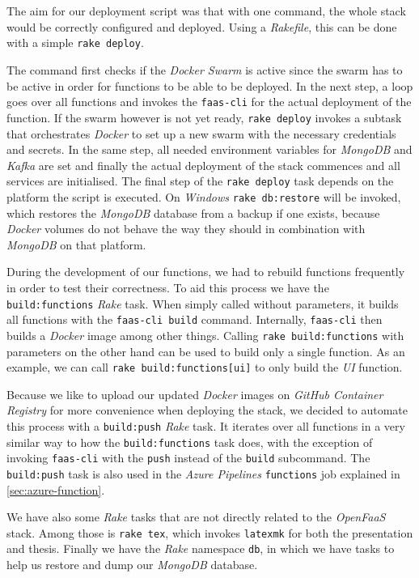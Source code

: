 \section{}

The aim for our deployment script was that with one command, the whole stack would be correctly
configured and deployed. Using a \textit{Rakefile}, this can be done with a simple
\lstinline{rake deploy}.

The command first checks if the \textit{Docker Swarm} is active since the swarm has to be active in
order for functions to be able to be deployed. In the next step, a loop goes over all functions and
invokes the \texttt{faas-cli} for the actual deployment of the function. If the swarm however is not
yet ready, \lstinline{rake deploy} invokes a subtask that orchestrates \textit{Docker} to set up a
new swarm with the necessary credentials and secrets. In the same step, all needed environment variables
for \textit{MongoDB} and \textit{Kafka} are set and finally the actual deployment of the stack
commences and all services are initialised. The final step of the \lstinline{rake deploy} task
depends on the platform the script is executed. On \textit{Windows} \lstinline{rake db:restore} will
be invoked, which restores the \textit{MongoDB} database from a backup if one exists, because
\textit{Docker} volumes do not behave the way they should in combination with \textit{MongoDB} on
that platform.

During the development of our functions, we had to rebuild functions frequently in order to test
their correctness. To aid this process we have the \texttt{build:functions} \textit{Rake}
task. When simply called without parameters, it builds all functions with the \texttt{faas-cli
build} command. Internally, \texttt{faas-cli} then builds a \textit{Docker} image among other
things. Calling \lstinline{rake build:functions} with parameters on the other hand can be used to
build only a single function. As an example, we can call \lstinline{rake build:functions[ui]} to only
build the \textit{UI} function.

Because we like to upload our updated \textit{Docker} images on \textit{GitHub Container Registry}
for more convenience when deploying the stack, we decided to automate this process with a
\texttt{build:push} \textit{Rake} task. It iterates over all functions in a very similar way
to how the \texttt{build:functions} task does, with the exception of invoking
\texttt{faas-cli} with the \texttt{push} instead of the \texttt{build} subcommand. The
\texttt{build:push} task is also used in the \textit{Azure Pipelines} \texttt{functions} job
explained in \autoref{sec:azure-function}.

We have also some \textit{Rake} tasks that are not directly related to the \textit{OpenFaaS} stack.
Among those is \lstinline{rake tex}, which invokes \texttt{latexmk} for both the
presentation and thesis. Finally we have the \textit{Rake} namespace \texttt{db}, in which we
have tasks to help us restore and dump our \textit{MongoDB} database.
